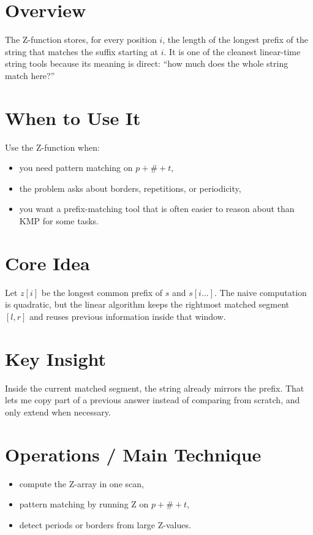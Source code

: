 \section*{Overview}

The Z-function stores, for every position \(i\), the length of the longest prefix of the string that matches the
suffix starting at \(i\). It is one of the cleanest linear-time string tools because its meaning is direct: ``how much
does the whole string match here?''

\section*{When to Use It}

Use the Z-function when:

\begin{itemize}
  \item you need pattern matching on \(p + \# + t\),
  \item the problem asks about borders, repetitions, or periodicity,
  \item you want a prefix-matching tool that is often easier to reason about than KMP for some tasks.
\end{itemize}

\section*{Core Idea}

Let \(z[i]\) be the longest common prefix of \(s\) and \(s[i \dots]\). The naive computation is quadratic, but the
linear algorithm keeps the rightmost matched segment \([l, r]\) and reuses previous information inside that window.

\section*{Key Insight}

Inside the current matched segment, the string already mirrors the prefix. That lets me copy part of a previous answer
instead of comparing from scratch, and only extend when necessary.

\section*{Operations / Main Technique}

\begin{itemize}
  \item compute the Z-array in one scan,
  \item pattern matching by running Z on \(p + \# + t\),
  \item detect periods or borders from large Z-values.
\end{itemize}

